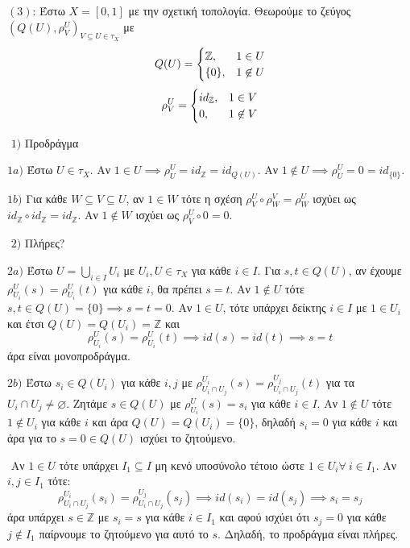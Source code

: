 \vspace*{0.3cm}

$(3)$: Έστω $X= [0,1]$ με την σχετική τοπολογία. Θεωρούμε το ζεύγος $(Q(U),\rho^U_V)_{V\subseteq U \in \tau_X}$ με
$$Q(U)=\begin{cases}
\mathbb{Z}, & 1 \in U \\
\{0\}, & 1 \not\in U
\end{cases}$$
$$\rho^U_V = \begin{cases}
    id_{\mathbb{Z}}, & 1 \in V \\
    0, & 1 \not\in V
\end{cases}$$

$ $\newline
$1)$ Προδράγμα

$1a)$ Έστω $U\in \tau_X$. Αν $1\in U \implies \rho^U_U = id_{\mathbb{Z}} = id_{Q(U)}$. Αν $1\not\in U \implies \rho^U_U = 0 = id_{ \{ 0 \}}$.

$1b)$ Για κάθε $W\subseteq V \subseteq U$, αν $1 \in W$ τότε η σχέση $\rho^U_V \circ \rho^V_W = \rho^U_W$ ισχύει ως $id_{\mathbb{Z}} \circ id_{\mathbb{Z}} = id_{\mathbb{Z}}$. Αν $1 \not\in W$ ισχύει ως $\rho^U_V \circ 0 = 0$.

$ $\newline
$2)$ Πλήρες?

$2a)$ Έστω $U = \bigcup\limits_{i\in I} U_i$ με $U_i,U \in \tau_X$ για κάθε $i \in I$. Για $s,t \in Q(U)$, αν έχουμε $\rho^U_{U_i}(s) = \rho^U_{U_i}(t)$ για κάθε $i$, θα πρέπει $s=t$. Αν $1 \not \in U$ τότε $s,t \in Q(U) = \{0\} \implies s=t=0$. Αν $1 \in U$, τότε υπάρχει δείκτης $i \in I$ με $1 \in U_i$ και έτσι $Q(U) = Q(U_i) = \mathbb{Z}$ και 
$$\rho^U_{U_i}(s) = \rho^U_{U_i}(t) \implies id(s) = id(t) \implies s=t$$ άρα είναι μονοπροδράγμα.

$2b)$ Έστω $s_i \in Q(U_i)$ για κάθε $i,j$ με $\rho^{U_i}_{U_i\cap U_j}(s) = \rho^{U_j}_{U_i\cap U_j}(t)$ για τα $U_i \cap U_j \neq \varnothing$. Ζητάμε $s \in Q(U)$ με $\rho^U_{U_i}(s) = s_i$ για κάθε $i \in I$. Αν $1 \not\in U$ τότε $1\not\in U_i$ για κάθε $i$ και άρα $Q(U) = Q(U_i) = \{0\}$, δηλαδή $s_i = 0$ για κάθε $i$ και άρα για το $s=0 \in Q(U)$ ισχύει το ζητούμενο.

$ $\newline
Αν $1 \in U$ τότε υπάρχει $I_1 \subseteq I$ μη κενό υποσύνολο τέτοιο ώστε $1 \in U_i \forall \ i \in I_1$. Αν $i,j \in I_1$ τότε:
$$\rho^{U_i}_{U_i\cap U_j}(s_i) = \rho^{U_j}_{U_i\cap U_j}(s_j) \implies id(s_i) = id(s_j) \implies s_i = s_j$$ άρα υπάρχει $s \in \mathbb{Z}$ με $s_i = s$ για κάθε $i \in I_1$ και αφού ισχύει ότι $s_j = 0$ για κάθε $j\not \in I_1$ παίρνουμε το ζητούμενο για αυτό το $s$. Δηλαδή, το προδράγμα είναι πλήρες.


